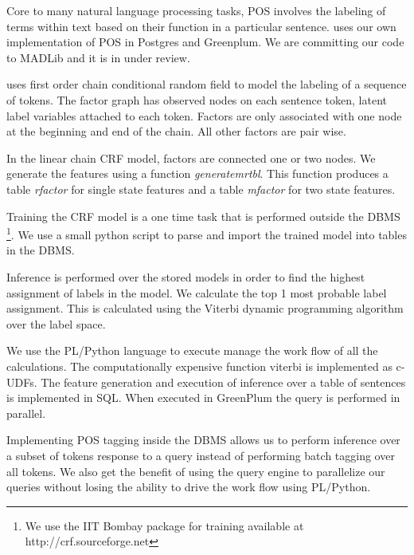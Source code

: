 
Core to many natural language processing tasks, POS involves the
labeling of terms within text based on their function in a particular sentence.
\system uses our own implementation of POS in Postgres and Greenplum. We are
committing our code to MADLib and it is in under review.

\system uses first order chain conditional random field to model the labeling
of a sequence of tokens. The factor graph has observed nodes on each sentence
token, latent label variables attached to each token.
Factors are only associated with one node at the beginning and end of the chain.
All other factors are pair wise.  

In the linear chain CRF model, factors are connected one or two nodes.  
We generate the features using a function \textit{generatemrtbl}. 
This function produces a table
\textit{rfactor} for single state features and a table \textit{mfactor} for two
state features.

Training the CRF model is a one time task that is performed outside the 
DBMS \footnote{We use the IIT Bombay package for training available at 
http://crf.sourceforge.net }.
We use a small python script to parse and import the trained model into 
tables in the DBMS. 

Inference is performed over the stored models in order to find the highest 
assignment of labels in the model.
We calculate the top 1 most probable label assignment. This is calculated using
the Viterbi dynamic programming algorithm over the label space.


We use the PL/Python language to execute manage the work flow of all the 
calculations.
The computationally expensive function viterbi is implemented as c-UDFs.
The feature generation and execution of inference 
over a table of sentences is implemented in SQL. When executed in GreenPlum 
the query is performed in parallel.


Implementing POS tagging inside the DBMS allows us to perform inference over a 
subset of tokens response to a query instead of performing batch tagging over 
all tokens.
We also get the benefit of using the query engine to parallelize our queries
without losing the ability to drive the work flow using PL/Python.






